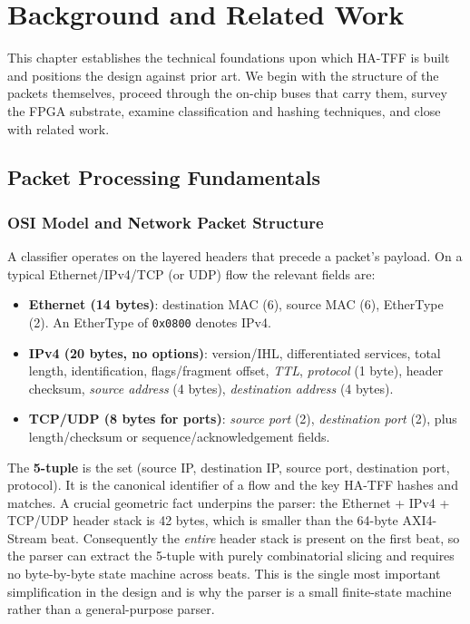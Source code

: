 \documentclass[12pt,twoside,openright]{book}
\begin{document}
\chapter{Background and Related Work}
\label{chap:background}

This chapter establishes the technical foundations upon which HA-TFF is built and positions the
design against prior art. We begin with the structure of the packets themselves, proceed through
the on-chip buses that carry them, survey the FPGA substrate, examine classification and hashing
techniques, and close with related work.

\section{Packet Processing Fundamentals}

\subsection{OSI Model and Network Packet Structure}

A classifier operates on the layered headers that precede a packet's payload. On a typical
Ethernet/IPv4/TCP (or UDP) flow the relevant fields are:

\begin{itemize}[itemsep=2pt]
  \item \textbf{Ethernet (14 bytes)}: destination MAC (6), source MAC (6), EtherType (2). An
        EtherType of \texttt{0x0800} denotes IPv4.
  \item \textbf{IPv4 (20 bytes, no options)}: version/IHL, differentiated services, total length,
        identification, flags/fragment offset, \emph{TTL}, \emph{protocol} (1 byte), header
        checksum, \emph{source address} (4 bytes), \emph{destination address} (4 bytes).
  \item \textbf{TCP/UDP (8 bytes for ports)}: \emph{source port} (2), \emph{destination port} (2),
        plus length/checksum or sequence/acknowledgement fields.
\end{itemize}

The \textbf{5-tuple} is the set (source IP, destination IP, source port, destination port,
protocol). It is the canonical identifier of a flow and the key HA-TFF hashes and matches. A crucial
geometric fact underpins the parser: the Ethernet + IPv4 + TCP/UDP header stack is 42 bytes, which
is smaller than the 64-byte AXI4-Stream beat. Consequently the \emph{entire} header stack is present
on the first beat, so the parser can extract the 5-tuple with purely combinatorial slicing and
requires no byte-by-byte state machine across beats. This is the single most important
simplification in the design and is why the parser is a small finite-state machine rather than a
general-purpose parser.
\end{document}
